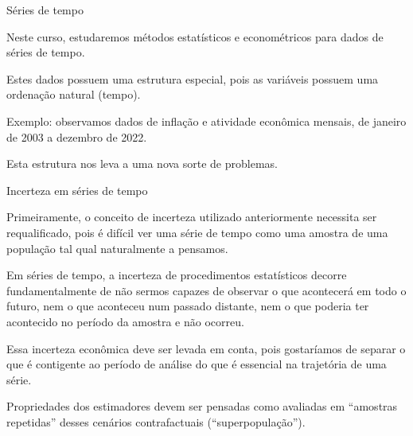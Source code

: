 \documentclass[11pt]{beamer}
\newenvironment{halfwideitemize}{\itemize\addtolength{\itemsep}{0.5em}}{\enditemize}
\begin{document}
	\begin{frame}{Séries de tempo}
		\begin{halfwideitemize}
			\item Neste curso, estudaremos métodos estatísticos e econométricos para dados de {\color{blue}séries de tempo}.
			\item Estes dados possuem uma estrutura especial, pois as variáveis possuem uma ordenação natural (tempo).
			\begin{halfwideitemize}
				\item Exemplo: observamos dados de inflação e atividade econômica mensais, de janeiro de 2003 a dezembro de 2022.
			\end{halfwideitemize} 
			\item Esta estrutura nos leva a uma nova sorte de problemas.
		\end{halfwideitemize}
	\end{frame}
	\begin{frame}{Incerteza em séries de tempo}
		\begin{halfwideitemize}
			\item Primeiramente, o conceito de incerteza utilizado anteriormente necessita ser requalificado, pois é difícil ver uma série de tempo como uma amostra de uma população tal qual {\color{blue}naturalmente a pensamos}.
			\begin{halfwideitemize}
				\item Em séries de tempo, a incerteza de procedimentos estatísticos decorre fundamentalmente de não sermos capazes de observar o que acontecerá em todo o futuro, nem o que aconteceu num passado distante, {\color{blue}nem o que poderia ter acontecido no período da amostra e não ocorreu}. 
				\item Essa incerteza {\color{blue}econômica} deve ser levada em conta, pois gostaríamos de separar o que é {\color{blue}contigente} ao período de análise do que é {\color{blue}essencial} na trajetória de uma série.
				\item Propriedades dos estimadores devem ser pensadas como avaliadas em ``amostras repetidas'' desses cenários contrafactuais (``superpopulação'').
			\end{halfwideitemize}
		\end{halfwideitemize}
	\end{frame}
\end{document}
